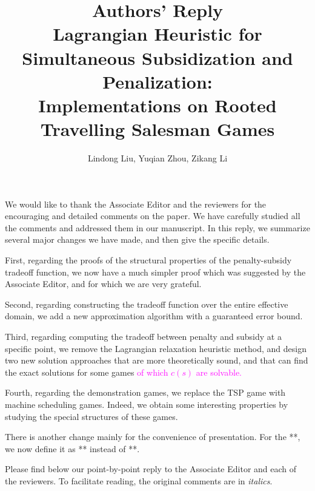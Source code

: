 \documentclass[11pt]{article}
\title{\textbf{Authors' Reply\\Lagrangian Heuristic for Simultaneous Subsidization and Penalization:\\
Implementations on Rooted Travelling Salesman Games}}
\author{Lindong Liu, Yuqian Zhou, Zikang Li}
\date{}
\begin{document}
\maketitle
\noindent
We would like to thank the Associate Editor and the reviewers for the encouraging and detailed comments on the paper. We have carefully studied all the comments and addressed them in our manuscript.
In this reply, we summarize several major changes we have made, and then give the specific details.


First, regarding the proofs of the structural properties of the penalty-subsidy tradeoff function, we now have a much simpler proof which was suggested by the Associate Editor, and for which we are very grateful.

Second, regarding constructing the tradeoff function over the entire effective domain, we add a new approximation algorithm with a guaranteed error bound.


Third, regarding computing the tradeoff between penalty and subsidy at a specific point, we remove the Lagrangian relaxation heuristic method, and design two new solution approaches that are more theoretically sound, and that can find the exact solutions for some games \textcolor{magenta}{of which $c(s)$ are solvable.}


Fourth, regarding the demonstration games, we replace the TSP game with machine scheduling games. Indeed, we obtain some interesting properties by studying the special structures of these games.

There is another change mainly for the convenience of presentation. For the **, we now define it as ** instead of **.

Please find below our point-by-point reply to the Associate Editor and each of the reviewers. To facilitate reading, the original comments are in {\it italics}.
\end{document}
